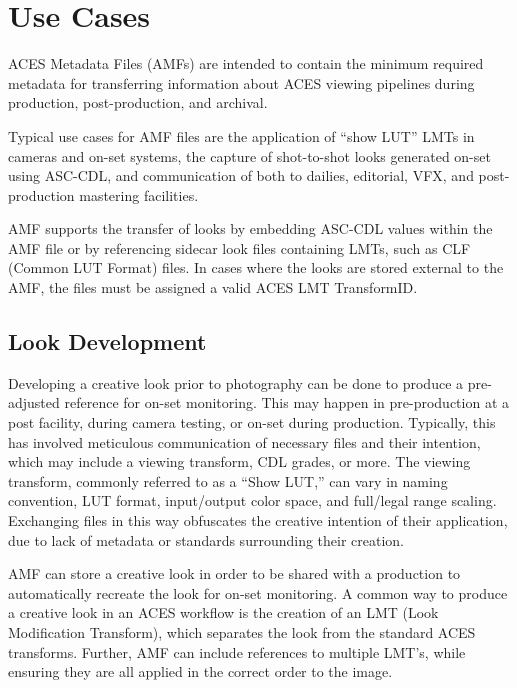 \regularsectionformat	%
\chapter{Use Cases}
ACES Metadata Files (AMFs) are intended to contain the minimum required metadata for transferring information about ACES viewing pipelines during production, post-production, and archival.

Typical use cases for AMF files are the application of ``show LUT'' LMTs in cameras and on-set systems, the capture of shot-to-shot looks generated on-set using ASC-CDL, and communication of both to dailies, editorial, VFX, and post-production mastering facilities.

AMF supports the transfer of looks by embedding ASC-CDL values within the AMF file or by referencing sidecar look files containing LMTs, such as CLF (Common LUT Format) files.  In cases where the looks are stored external to the AMF, the files must be assigned a valid ACES LMT TransformID.  

\section{Look Development}
Developing a creative look prior to photography can be done to produce a pre-adjusted reference for on-set monitoring. This may happen in pre-production at a post facility, during camera testing, or on-set during production. Typically, this has involved meticulous communication of necessary files and their intention, which may include a viewing transform, CDL grades, or more. The viewing transform, commonly referred to as a ``Show LUT,'' can vary in naming convention, LUT format, input/output color space, and full/legal range scaling. Exchanging files in this way obfuscates the creative intention of their application, due to lack of metadata or standards surrounding their creation.

AMF can store a creative look in order to be shared with a production to automatically recreate the look for on-set monitoring. A common way to produce a creative look in an ACES workflow is the creation of an LMT (Look Modification Transform), which separates the look from the standard ACES transforms. Further, AMF can include references to multiple LMT’s, while ensuring they are all applied in the correct order to the image.

